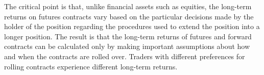 \documentclass[11pt]{article}
\begin{document}
The critical point is that, unlike financial assets such as equities, the long-term returns on futures contracts vary based on the particular decisions made by the holder of the position regarding the procedures used to extend the position into a longer position. The result is that the long-term returns of futures and forward contracts can be calculated only by making important assumptions about how and when the contracts are rolled over. Traders with different preferences for rolling contracts experience different long-term returns.
\end{document}
